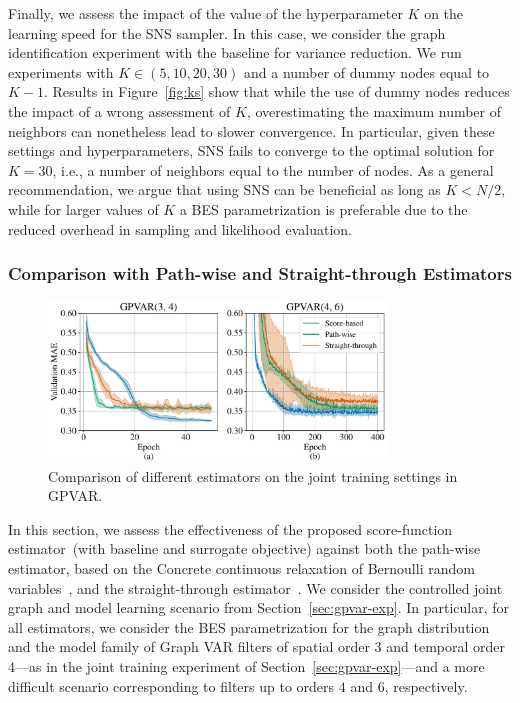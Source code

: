 Finally, we assess the impact of the value of the hyperparameter $K$ on the learning speed for the SNS sampler. In this case, we consider the graph identification experiment with the baseline for variance reduction. 
We run experiments with $K\in (5, 10, 20, 30)$ and a number of dummy nodes equal to $K-1$. Results in Figure~\ref{fig:ks} show that while the use of dummy nodes reduces the impact of a wrong assessment of $K$, overestimating the maximum number of neighbors can nonetheless lead to slower convergence. In particular, given these settings and hyperparameters, SNS fails to converge to the optimal solution for $K=30$, i.e., a number of neighbors equal to the number of nodes. As a general recommendation, we argue that using SNS can be beneficial as long as $K<N/2$, while for larger values of $K$ a BES parametrization is preferable due to the reduced overhead in sampling and likelihood evaluation.

\subsubsection{Comparison with Path-wise and Straight-through Estimators}

\begin{figure}[t]
    \centering
    \begin{minipage}{0.5\textwidth}
    \end{minipage}
    \begin{minipage}{0.49\textwidth}
    \end{minipage}
    \includegraphics[width=0.8\textwidth]{imgs/est_comp_jmlr.pdf}
    \caption{Comparison of different estimators on the joint training settings in GPVAR.}
    \label{fig:gpvar-comp-est}
\end{figure}

In this section, we assess the effectiveness of the proposed score-function estimator~(with baseline and surrogate objective) against both the path-wise estimator, based on the Concrete continuous relaxation of Bernoulli random variables~\citep{maddison2017concrete}, and the straight-through estimator~\citep{bengio2013estimating}. 
We consider the controlled joint graph and model learning scenario from Section~\ref{sec:gpvar-exp}.
In particular, for all estimators, we consider the BES parametrization for the graph distribution and the model family of Graph VAR filters of spatial order $3$ and temporal order $4$---as in the joint training experiment of Section~\ref{sec:gpvar-exp}---and a more difficult scenario corresponding to filters up to orders $4$ and $6$, respectively.

